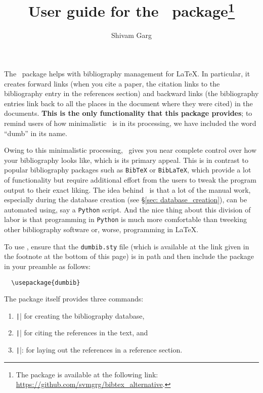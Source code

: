 \documentclass[letter, 12pt]{article}
\title{User guide for the \dumbib\ package\footnote{The package is available at the following link: \url{https://github.com/svmgrg/bibtex_alternative}.}}
\author{Shivam Garg}
\begin{document}
\maketitle

The \dumbib\ package helps with bibliography management for \LaTeX{}. In particular, it creates forward links (when you cite a paper, the citation links to the bibliography entry in the references section) and backward links (the bibliography entries link back to all the places in the document where they were cited) in the documents. \textbf{This is the only functionality that this package provides}; to remind users of how minimalistic \dumbib\ is in its processing, we have included the word ``dumb'' in its name.

Owing to this minimalistic processing, \dumbib\ gives you near complete control over how your bibliography looks like, which is its primary appeal. This is in contrast to popular bibliography packages such as \texttt{BibTeX} or \texttt{BibLaTeX}, which provide a lot of functionality but require additional effort from the users to tweak the program output to their exact liking. The idea behind \dumbib\ is that a lot of the manual work, especially during the database creation (see \S \ref{sec: database_creation}), can be automated using, say a \texttt{Python} script. And the nice thing about this division of labor is that programming in \texttt{Python} is much more comfortable than tweeking other bibliography software or, worse, programming in \LaTeX{}.

To use \dumbib, ensure that the \texttt{dumbib.sty} file (which is available at the link given in the footnote at the bottom of this page) is in path and then include the package in your preamble as follows:
\begin{verbatim}
  \usepackage{dumbib}
\end{verbatim}
The package itself provides three commands:
\begin{enumerate}
\item \texttt|\dumbibReferenceEntry{}| for creating the bibliography database,
\item \texttt|\cite{}| for citing the references in the text, and
\item \texttt|\dumbibCreateBibliography|: for laying out the references in a reference section.
\end{enumerate}
\end{document}
